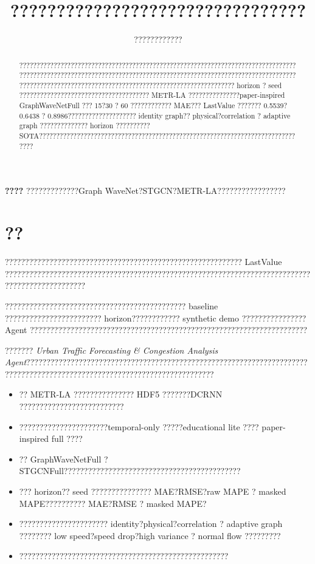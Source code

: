 \documentclass[11pt]{ctexart}
\title{????????????????????????????????}
\author{????????????}
\date{}
\begin{document}
\maketitle

\begin{abstract}
????????????????????????????????????????????????????????????????????????????????????????????????????????????????????????????????????????????????????????????????????????????????????????????????????????????????????????????????? horizon ? seed ?????????????????????????????????????? METR-LA ???????????????paper-inspired GraphWaveNetFull ??? 15?30 ? 60 ???????????? MAE??? LastValue ??????? 0.5539?0.6438 ? 0.8986???????????????????? identity graph?? physical?correlation ? adaptive graph ?????????????? horizon ?????????? SOTA???????????????????????????????????????????????????????????????????????????????
\end{abstract}

\textbf{????} ?????????????Graph WaveNet?STGCN?METR-LA?????????????????

\section{??}
??????????????????????????????????????????????????????????? LastValue ????????????????????????????????????????????????????????????????????????????????????????????????

????????????????????????????????????????????? baseline ???????????????????????? horizon???????????? synthetic demo ???????????????? Agent ?????????????????????????????????????????????????????????????????????

??????? \emph{Urban Traffic Forecasting \& Congestion Analysis Agent}??????????????????????????????????????????????????????????????????????????????????????????????????????????????????????????
\begin{itemize}[leftmargin=*]
  \item ?? METR-LA ??????????????? HDF5 ???????DCRNN ??????????????????????????
  \item ??????????????????????temporal-only ?????educational lite ???? paper-inspired full ????
  \item ?? GraphWaveNetFull ? STGCNFull????????????????????????????????????????????
  \item ??? horizon?? seed ??????????????? MAE?RMSE?raw MAPE ? masked MAPE?????????? MAE?RMSE ? masked MAPE?
  \item ?????????????????????? identity?physical?correlation ? adaptive graph ???????? low speed?speed drop?high variance ? normal flow ?????????
  \item ????????????????????????????????????????????????????
\end{itemize}
\end{document}
